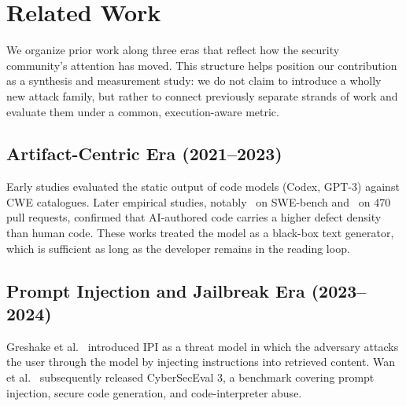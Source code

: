 \documentclass[twocolumn]{svjour3}
\begin{document}
\section{Related Work}
\label{sec:relwork}

We organize prior work along three eras that reflect how the security community's attention has moved. This structure helps position our contribution as a synthesis and measurement study: we do not claim to introduce a wholly new attack family, but rather to connect previously separate strands of work and evaluate them under a common, execution-aware metric.

\subsection{Artifact-Centric Era (2021--2023)}
Early studies evaluated the static output of code models (Codex, GPT-3) against CWE catalogues. Later empirical studies, notably~\cite{sajadi2025aigenfixes} on SWE-bench and~\cite{coderabbit2025state} on 470 pull requests, confirmed that AI-authored code carries a higher defect density than human code. These works treated the model as a black-box text generator, which is sufficient as long as the developer remains in the reading loop.

\subsection{Prompt Injection and Jailbreak Era (2023--2024)}
Greshake et al.~\cite{greshake2023notwhat} introduced IPI as a threat model in which the adversary attacks the user through the model by injecting instructions into retrieved content. Wan et al.~\cite{wan2024cyberseceval3} subsequently released CyberSecEval 3, a benchmark covering prompt injection, secure code generation, and code-interpreter abuse.
\end{document}
